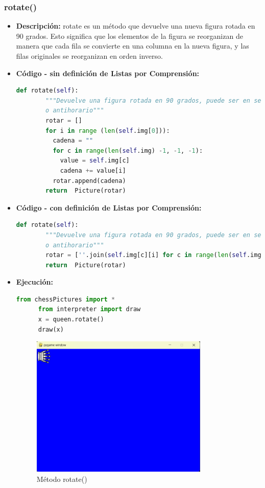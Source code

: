 \documentclass{article}
\begin{document}

  \subsubsection{rotate()}
  \begin{itemize}
    \item \textbf{Descripción: }
      rotate es un método que devuelve una nueva figura rotada en 90 grados. Esto significa que los elementos de la figura se reorganizan 
      de manera que cada fila se convierte en una columna en la nueva figura, y las filas originales se reorganizan en orden inverso.
    \item \textbf{Código - sin definición de Listas por Comprensión:}
    \begin{lstlisting}[language=Python, caption=Método rotate()]
      def rotate(self):
        """Devuelve una figura rotada en 90 grados, puede ser en sentido horario
        o antihorario"""
        rotar = []
        for i in range (len(self.img[0])):
          cadena = ""
          for c in range(len(self.img) -1, -1, -1):
            value = self.img[c]
            cadena += value[i]
          rotar.append(cadena)
        return  Picture(rotar)
    \end{lstlisting}
    \item \textbf{Código - con definición de Listas por Comprensión:}
    \begin{lstlisting}[language=Python, caption=Método rotate()]
      def rotate(self):
        """Devuelve una figura rotada en 90 grados, puede ser en sentido horario
        o antihorario"""
        rotar = [''.join(self.img[c][i] for c in range(len(self.img) - 1, -1, -1)) for i in range(len(self.img[0]))]
        return  Picture(rotar)
    \end{lstlisting}
    \item \textbf{Ejecución:}
    \begin{lstlisting}[language=Python, caption=Prueba rotate()]
      from chessPictures import *
      from interpreter import draw
      x = queen.rotate()
      draw(x)
    \end{lstlisting}
    \newpage
    \begin{figure}[H]
      \centering
      \includegraphics[width=0.8\textwidth, keepaspectratio]{img/rotate.png}
      \caption{Método rotate()}
    \end{figure}
  \end{itemize}
\end{document}
